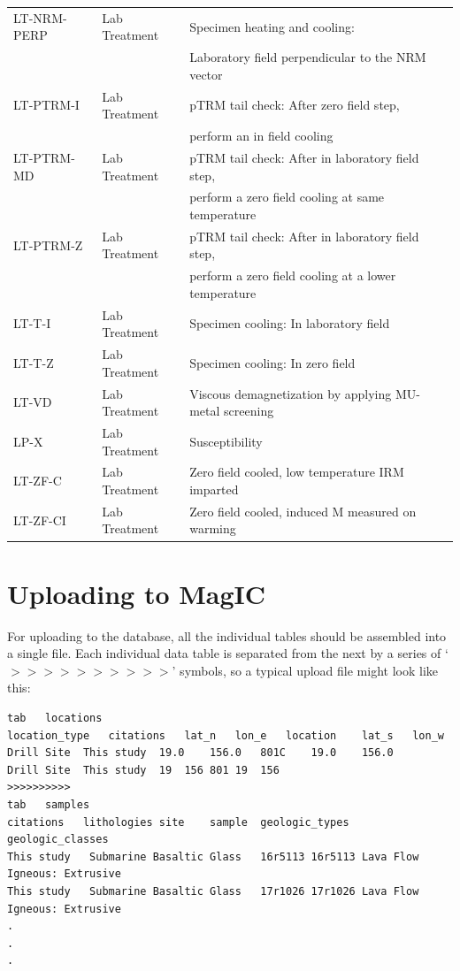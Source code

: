 \documentclass[11pt]{book}
\begin{document}
{{{\begin{tabular}{lll}
LT-NRM-PERP \qquad & Lab Treatment \qquad & Specimen heating and cooling: \\
\qquad &\qquad &Laboratory field perpendicular to the NRM vector\\
LT-PTRM-I \qquad & Lab Treatment \qquad & pTRM tail check: After zero field step, \\
\qquad &\qquad &perform an in field cooling\\
LT-PTRM-MD \qquad & Lab Treatment \qquad & pTRM tail check: After in laboratory field step, \\
\qquad &\qquad &perform a zero field cooling at same temperature\\
LT-PTRM-Z \qquad & Lab Treatment \qquad & pTRM tail check: After in laboratory field step,\\
\qquad &\qquad & perform a zero field cooling at a lower temperature\\
LT-T-I \qquad & Lab Treatment \qquad & Specimen cooling: In laboratory field\\
LT-T-Z \qquad & Lab Treatment \qquad & Specimen cooling: In zero field\\
LT-VD \qquad & Lab Treatment \qquad & Viscous demagnetization by applying MU-metal screening\\
LP-X \qquad & Lab Treatment \qquad & Susceptibility\\
LT-ZF-C \qquad & Lab Treatment \qquad & Zero field cooled, low temperature IRM imparted\\
LT-ZF-CI \qquad & Lab Treatment \qquad & Zero field cooled, induced M measured on warming\\
\hline
\end{tabular}

\section{Uploading to MagIC}

For uploading to the database, all the individual tables should be assembled into a single file.  Each individual data table is separated from the next by a series of `$>>>>>>>>>>$' symbols, so a typical upload file might look like this:


\begin{verbatim}
tab   locations
location_type	citations	lat_n	lon_e	location	lat_s	lon_w
Drill Site	This study	19.0	156.0	801C	19.0	156.0
Drill Site	This study	19	156	801	19	156
>>>>>>>>>>
tab   samples
citations	lithologies	site	sample	geologic_types	geologic_classes
This study   Submarine Basaltic Glass	16r5113	16r5113	Lava Flow	Igneous: Extrusive
This study   Submarine Basaltic Glass	17r1026	17r1026	Lava Flow	Igneous: Extrusive
.
.
.
\end{verbatim}

}}}
\end{document}

